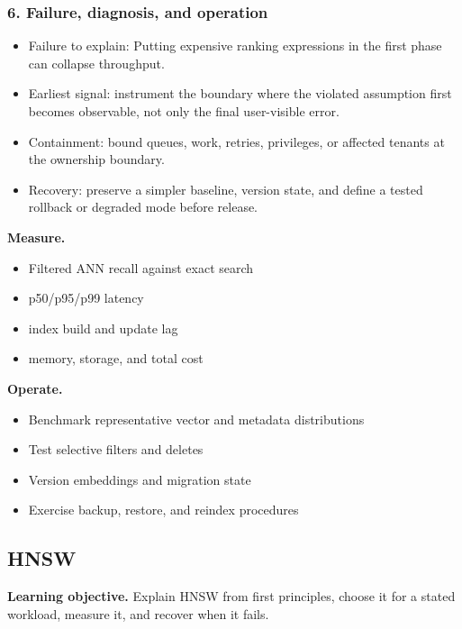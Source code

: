 \subsubsection*{6. Failure, diagnosis, and operation}
\begin{itemize}
\item Failure to explain: Putting expensive ranking expressions in the first phase can collapse throughput.
\item Earliest signal: instrument the boundary where the violated assumption first becomes observable, not only the final user-visible error.
\item Containment: bound queues, work, retries, privileges, or affected tenants at the ownership boundary.
\item Recovery: preserve a simpler baseline, version state, and define a tested rollback or degraded mode before release.
\end{itemize}
\textbf{Measure.}\begin{itemize}
\item Filtered ANN recall against exact search
\item p50/p95/p99 latency
\item index build and update lag
\item memory, storage, and total cost
\end{itemize}
\textbf{Operate.}\begin{itemize}
\item Benchmark representative vector and metadata distributions
\item Test selective filters and deletes
\item Version embeddings and migration state
\item Exercise backup, restore, and reindex procedures
\end{itemize}
\subsection{HNSW}
\textbf{Learning objective.} Explain HNSW from first principles, choose it for a stated workload, measure it, and recover when it fails.
